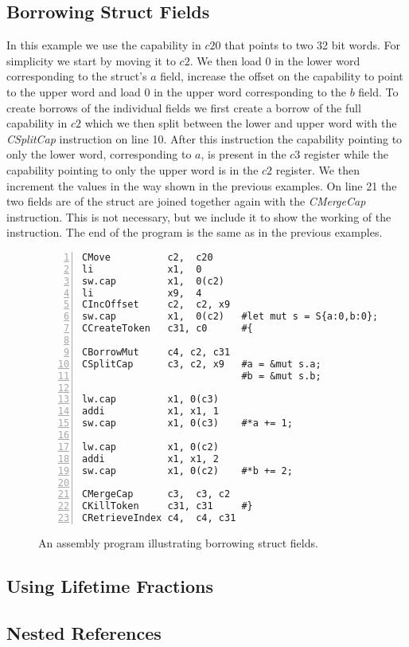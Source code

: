 \subsection{Borrowing Struct Fields}
In this example we use the capability in $c20$ that points to two 32 bit words.
For simplicity we start by moving it to $c2$.
We then load 0 in the lower word corresponding to the struct's $a$ field, increase the offset on the capability to point to the upper word and load 0 in the upper word corresponding to the $b$ field.
To create borrows of the individual fields we first create a borrow of the full capability in $c2$ which we then split between the lower and upper word with the \textit{CSplitCap} instruction on line 10.
After this instruction the capability pointing to only the lower word, corresponding to $a$, is present in the $c3$ register while the capability pointing to only the upper word is in the $c2$ register.
We then increment the values in the way shown in the previous examples.
On line 21 the two fields are of the struct are joined together again with the \textit{CMergeCap} instruction.
This is not necessary, but we include it to show the working of the instruction.
The end of the program is the same as in the previous examples.
\begin{figure}[h]
\begin{lstlisting}[style=custASM, numbers = left ,xleftmargin=1.5em]
CMove          c2,  c20
li             x1,  0
sw.cap         x1,  0(c2)
li             x9,  4
CIncOffset     c2,  c2, x9
sw.cap         x1,  0(c2)   #let mut s = S{a:0,b:0};
CCreateToken   c31, c0      #{

CBorrowMut     c4, c2, c31
CSplitCap      c3, c2, x9   #a = &mut s.a;
                            #b = &mut s.b;

lw.cap         x1, 0(c3)
addi           x1, x1, 1
sw.cap         x1, 0(c3)    #*a += 1;

lw.cap         x1, 0(c2)
addi           x1, x1, 2
sw.cap         x1, 0(c2)    #*b += 2;

CMergeCap      c3,  c3, c2
CKillToken     c31, c31     #}
CRetrieveIndex c4,  c4, c31
\end{lstlisting}
\caption{An assembly program illustrating borrowing struct fields.}
\label{fig:asmstructexample}
\end{figure}

\subsection{Using Lifetime Fractions}


\subsection{Nested References}
